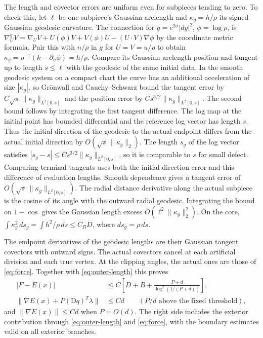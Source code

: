 The length and covector errors are uniform even for subpieces tending to zero. To check this, let \(\ell\) be one subpiece's Gaussian arclength and \(\kappa_g=h/\rho\) its signed Gaussian geodesic curvature. The connection for \(g=e^{2\phi}|dy|^2\), \(\phi=\log\rho\), is \(\nabla^g_U V=\nabla_U V+U(\phi)V+V(\phi)U-(U\cdot V)\nabla\phi\) by the coordinate metric formula. Pair this with \(n/\rho\) in \(g\) for \(U=V=u/\rho\) to obtain \(\kappa_g=\rho^{-1}(k-\partial_n\phi)=h/\rho\). Compare its Gaussian arclength position and tangent up to length \(s\le\ell\) with the geodesic of the same initial data. In the smooth geodesic system on a compact chart the curve has an additional acceleration of size \(|\kappa_g|\), so Grönwall and Cauchy--Schwarz bound the tangent error by \(C\sqrt s\,\|\kappa_g\|_{L^2[0,s]}\) and the position error by \(C s^{3/2}\|\kappa_g\|_{L^2[0,s]}\). The second bound follows by integrating the first tangent difference. The log map at the initial point has bounded differential and the reference log vector has length \(s\). Thus the initial direction of the geodesic to the actual endpoint differs from the actual initial direction by \(O(\sqrt s\,\|\kappa_g\|_2)\). The length \(s_g\) of the log vector satisfies \(|s_g-s|\le Cs^{3/2}\|\kappa_g\|_{L^2[0,s]}\), so it is comparable to \(s\) for small defect. Comparing terminal tangents uses both the initial-direction error and this difference of evaluation lengths. Smooth dependence gives a tangent error of \(O(\sqrt s\,\|\kappa_g\|_{L^2[0,s]})\). The radial distance derivative along the actual subpiece is the cosine of its angle with the outward radial geodesic. Integrating the bound on \(1-\cos\) gives the Gaussian length excess \(O(\ell^2\|\kappa_g\|_2^2)\). On the core, \(\int\kappa_g^2\,ds_g=\int h^2/\rho\,ds\le C_R D\), where \(ds_g=\rho\,ds\).

The endpoint derivatives of the geodesic lengths are their Gaussian tangent covectors with outward signs. The actual covectors cancel at each artificial division and each true vertex. At the clipping angles, the actual ones are those of \eqref{eq:force}. Together with \eqref{eq:outer-length} this proves \begin{equation}\label{eq:core-length}
 \begin{split}
 |F-E(x)|&\le C\left[D+B+\frac{P+d}{\log^2(1/(P+d))}\right],\\
 \|\nabla E(x)+P(\mathrm Dq)^T\lambda\|&\le C d\qquad(P/d\text{ above the fixed threshold}),
 \end{split}
\end{equation} and \(\|\nabla E(x)\|\le Cd\) when \(P=O(d)\). The right side includes the exterior contribution through \eqref{eq:outer-length} and \eqref{eq:force}, with the boundary estimates valid on all exterior branches.

